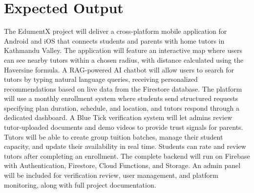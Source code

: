 \documentclass[12pt]{report}
\makeatletter
\newcommand{\addtocentrywithoutpage}[3]{%
  \addtocontents{#1}{\protect\contentsline{#2}{#3}{}{\@currentHref}}%
}
\makeatother
\begin{document}
\chapter{Expected Output}

The EdumentX project will deliver a cross-platform mobile application for Android and iOS that connects students and parents with home tutors in Kathmandu Valley. The application will feature an interactive map where users can see nearby tutors within a chosen radius, with distance calculated using the Haversine formula. A RAG-powered AI chatbot will allow users to search for tutors by typing natural language queries, receiving personalized recommendations based on live data from the Firestore database. The platform will use a monthly enrollment system where students send structured requests specifying plan duration, schedule, and location, and tutors respond through a dedicated dashboard. A Blue Tick verification system will let admins review tutor-uploaded documents and demo videos to provide trust signals for parents. Tutors will be able to create group tuition batches, manage their student capacity, and update their availability in real time. Students can rate and review tutors after completing an enrollment. The complete backend will run on Firebase with Authentication, Firestore, Cloud Functions, and Storage. An admin panel will be included for verification review, user management, and platform monitoring, along with full project documentation.

\renewcommand{\bibname}{References}
\addtocentrywithoutpage{toc}{chapter}{References}
\begingroup
\sloppy
{}


\endgroup
\end{document}
